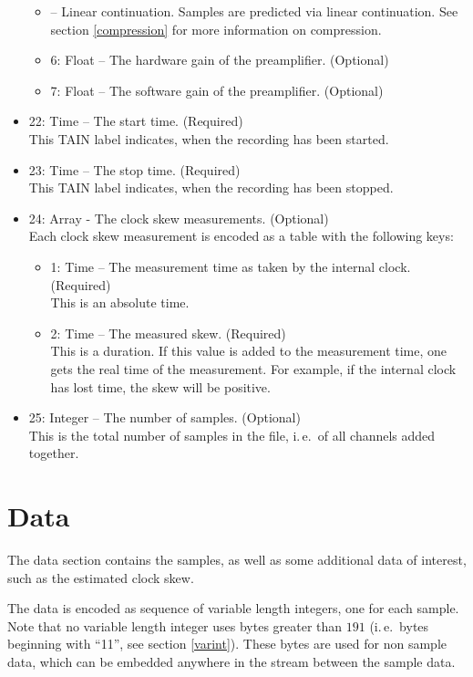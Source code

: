 \documentclass[DIV=10]{scrartcl}
\renewenvironment{quote}
{\list{}{
  \setlength{\rightmargin}{0cm}
  \setlength{\leftmargin}{0.75cm}}%
\item\relax\ignorespaces}
{\unskip\unskip\endlist}
\begin{document}
\begin{itemize}
\begin{itemize}
\begin{quote}
      2 – Linear continuation.
      Samples are predicted via linear continuation.
    \end{quote}
    See section \ref{compression} for more information on compression.
    \item 6: Float – The hardware gain of the preamplifier. (Optional)
    \item 7: Float – The software gain of the preamplifier. (Optional)
  \end{itemize}
  \item 22: Time – The start time. (Required)\\
  This TAIN label indicates, when the recording has been started.
  \item 23: Time – The stop time. (Required)\\
  This TAIN label indicates, when the recording has been stopped.
  \item 24: Array - The clock skew measurements. (Optional)\\
  Each clock skew measurement is encoded as a table with the following keys:
  \begin{itemize}
    \item 1: Time – The measurement time as taken by the internal clock. (Required)\\
    This is an absolute time.
    \item 2: Time – The measured skew. (Required)\\
    This is a duration.
    If this value is added to the measurement time, one gets the real time of the measurement.
    For example, if the internal clock has lost time, the skew will be positive.
  \end{itemize}
  \item 25: Integer – The number of samples. (Optional)\\
  This is the total number of samples in the file, i.\,e.\ of all channels added together.
\end{itemize}

\section{Data}

The data section contains the samples, as well as some additional data of interest, such as the estimated clock skew.

The data is encoded as sequence of variable length integers, one for each sample.
Note that no variable length integer uses bytes greater than \(191\) (i.\,e.\ bytes beginning with “11”, see section \ref{varint}).
These bytes are used for non sample data, which can be embedded anywhere in the stream between the sample data.
\end{document}
